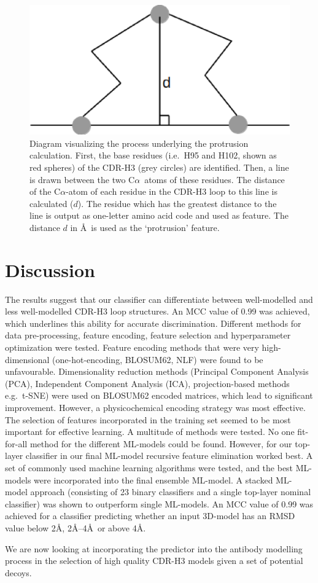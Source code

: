 \documentclass[12pt]{article}
\newcommand{\ca}{\mbox{C$\alpha$}}
\begin{document}
\begin{figure}
  \centering
  \includegraphics[scale=0.5]{protrusion.eps}
  \caption {Diagram
    visualizing the process underlying the protrusion
    calculation. First, the base residues (i.e.\ H95 and H102, shown as
    red spheres) of the CDR-H3 (grey circles) are identified. Then, a
    line is drawn between the two \ca\ atoms of these residues.
    The distance of the \ca-atom of each residue in the
    CDR-H3 loop to this line is calculated ($d$). The residue which has the
    greatest distance to the line is output
    as one-letter amino acid code and used as feature. The distance $d$ in
    \AA\ is used as the `protrusion'
    feature.}
  \label{fig:angle}
\end{figure}




\section{Discussion}
The results suggest that our classifier can differentiate
between well-modelled and less well-modelled CDR-H3 loop
structures. An MCC value of 0.99 was achieved, which underlines this
ability for accurate discrimination. Different methods for data
pre-processing, feature encoding, feature selection and hyperparameter
optimization were tested.
Feature encoding methods that were very high-dimensional
(one-hot-encoding, BLOSUM62, NLF) were found to be
unfavourable. Dimensionality reduction methods (Principal Component
Analysis (PCA), Independent Component Analysis (ICA), projection-based
methods e.g.\ t-SNE) were used on BLOSUM62 encoded matrices, which lead
to significant improvement. However, a physicochemical encoding
strategy was most effective.
The selection of features incorporated in the training set seemed to
be most important for effective learning. A multitude of methods were
tested. No one fit-for-all method for the different ML-models could be
found. However, for our top-layer classifier in our final ML-model
recursive feature elimination worked best.
A set of commonly used machine learning algorithms were tested, and
the best ML-models were incorporated into the final ensemble ML-model. A
stacked ML-model approach (consisting of 23 binary classifiers and a
single top-layer nominal classifier) was shown to outperform single
ML-models.
An MCC value of 0.99 was achieved for a classifier predicting whether
an input 3D-model has an RMSD value below 2\AA, 2\AA--4\AA\ or above
4\AA.

We are now looking at incorporating the predictor into the antibody
modelling process in the selection of high quality CDR-H3 models given
a set of potential decoys.



\end{document}

